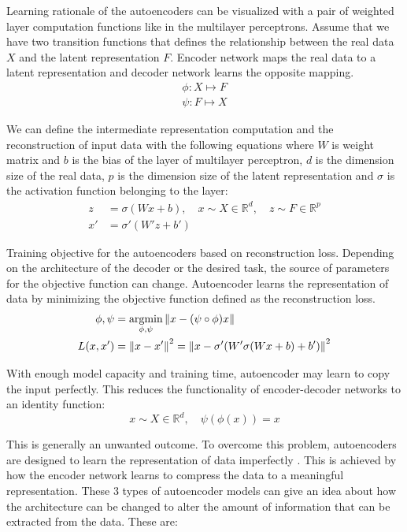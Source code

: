 Learning rationale of the autoencoders can be visualized with a pair of weighted layer computation
functions like in the multilayer perceptrons. Assume that we have two transition functions that
defines the relationship between the real data $X$ and the latent representation $F$. Encoder network maps the 
real data to a latent representation and decoder network learns the opposite mapping.
\begin{align*}
    \phi : X \mapsto F \\
    \psi : F \mapsto X     
\end{align*}

We can define the intermediate representation computation and the reconstruction of input data
with the following equations where $W$ is weight matrix and $b$ is the bias of the layer of multilayer 
perceptron, $d$ is the dimension size of the real data, $p$ is the dimension size of the latent representation 
and $\sigma$ is the activation function belonging to the layer:
\begin{align}  
    z  &= \sigma( W x + b) ,\quad x \sim X \in \mathbb{R}^d ,\quad z \sim F \in \mathbb{R}^p \\
    x'  &= \sigma' (W' z + b') 
\end{align}

Training objective for the autoencoders based on reconstruction loss. Depending on the
architecture of the decoder or the desired task, the source of parameters for the objective
function can change. Autoencoder learns the representation of data by minimizing the objective function 
defined as the reconstruction loss. 
\begin{align}
    \label{eqn:ae_rec}
  \phi, \psi & = \underset{\phi, \psi}{\text{argmin}} \left\lVert x - (\psi \circ \phi) x\right\rVert \\  
  L(x, x') & = \left\lVert x - x'\right\rVert^2 = \left\lVert x - \sigma' (W' \sigma (W x + b) + b')\right\rVert^2
\end{align}

With enough model capacity and training time, autoencoder may learn to copy the input perfectly.
This reduces the functionality of encoder-decoder networks to an identity function:
$$
 x \sim X \in \mathbb{R}^d, \quad \psi(\phi(x)) = x
$$

This is generally an unwanted outcome. To overcome this problem, autoencoders are designed to learn the
representation of data imperfectly \cite{Goodfellow-et-al-2016}. This is achieved by how the
encoder network learns to compress the data to a meaningful representation. These 3 types of
autoencoder models can give an idea about how the architecture can be changed to alter the amount of
information that can be extracted from the data. These are:

